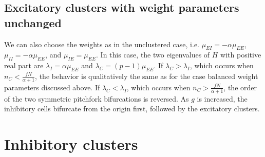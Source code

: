 \documentclass[reqno]{siamonline190516}
\newcommand{\Kvec}{\mathbf{K}}
\begin{document}


\subsection{Excitatory clusters with weight parameters unchanged}

We can also choose the weights as in the unclustered case, i.e. $\mu_{EI} = -\alpha \mu_{EE}$, $\mu_{II} = -\alpha \mu_{EE}$, and $\mu_{IE} = \mu_{EE}$. In this case, the two eigenvalues of $H$ with positive real part are $\lambda_I = \alpha \mu_{EE}$ and $\lambda_C = (p-1)\mu_{EE}$. If $\lambda_C > \lambda_I$, which occurs when $n_C < \frac{f N}{\alpha+1}$, the behavior is qualitatively the same as for the case balanced weight parameters discussed above. If  $\lambda_C < \lambda_I$, which occurs when $n_C > \frac{f N}{\alpha+1}$, the order of the two symmetric pitchfork bifurcations is reversed. As $g$ is increased, the inhibitory cells bifurcate from the origin first, followed by the excitatory clusters.


\section{Inhibitory clusters}\label{sec:inhibitoryclusters}
\end{document}

